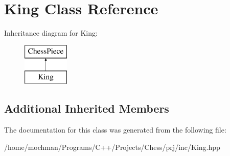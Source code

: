 \hypertarget{class_king}{\section{King Class Reference}
\label{class_king}
}
Inheritance diagram for King\-:\begin{figure}[H]
\begin{center}
\leavevmode
\includegraphics[height=2.000000cm]{class_king}
\end{center}
\end{figure}
\subsection*{Additional Inherited Members}


The documentation for this class was generated from the following file\-:\begin{DoxyCompactItemize}
\item 
/home/mochman/\-Programs/\-C++/\-Projects/\-Chess/prj/inc/King.\-hpp\end{DoxyCompactItemize}
